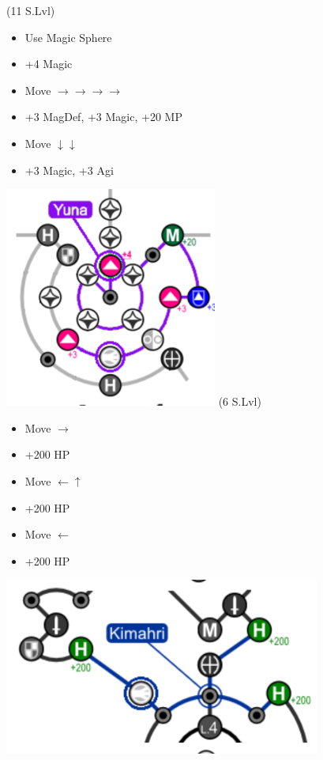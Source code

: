 \begin{spheregrid}
  \begin{itemize}
    \yunaf (11 S.Lvl)
    \begin{itemize}
      \item Use Magic Sphere
      \item +4 Magic
      \item Move $\rightarrow\rightarrow\rightarrow\rightarrow$
      \item +3 MagDef, +3 Magic, +20 MP
      \item Move $\downarrow\downarrow$
      \item +3 Magic, +3 Agi
    \end{itemize}
    \includegraphics{graphics/yunammr}
    \kimahrif (6 S.Lvl)
    \begin{itemize}
      \item Move $\rightarrow$
      \item +200 HP
      \item Move $\leftarrow\uparrow$
      \item +200 HP
      \item Move $\leftarrow$
      \item +200 HP
    \end{itemize}
    \includegraphics{graphics/kimahrimmr}

\end{itemize}
\end{spheregrid}
